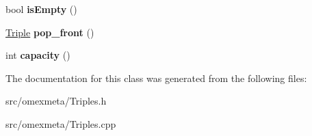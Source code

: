 \begin{DoxyCompactItemize}
\item 
\mbox{\label{classomexmeta_1_1Triples_a48ab93d0e38e3cfcb4eac9264b047f0a}} 
bool {\bfseries is\+Empty} ()
\item 
\mbox{\label{classomexmeta_1_1Triples_abb333b83c7a8ed1f210816ef88c8d3a0}} 
\hyperlink{classomexmeta_1_1Triple}{Triple} {\bfseries pop\+\_\+front} ()
\item 
\mbox{\label{classomexmeta_1_1Triples_a1f7ba9d5cd575ba5c63ed9dbbd1f279c}} 
int {\bfseries capacity} ()
\end{DoxyCompactItemize}


The documentation for this class was generated from the following files\+:\begin{DoxyCompactItemize}
\item 
src/omexmeta/Triples.\+h\item 
src/omexmeta/Triples.\+cpp\end{DoxyCompactItemize}
